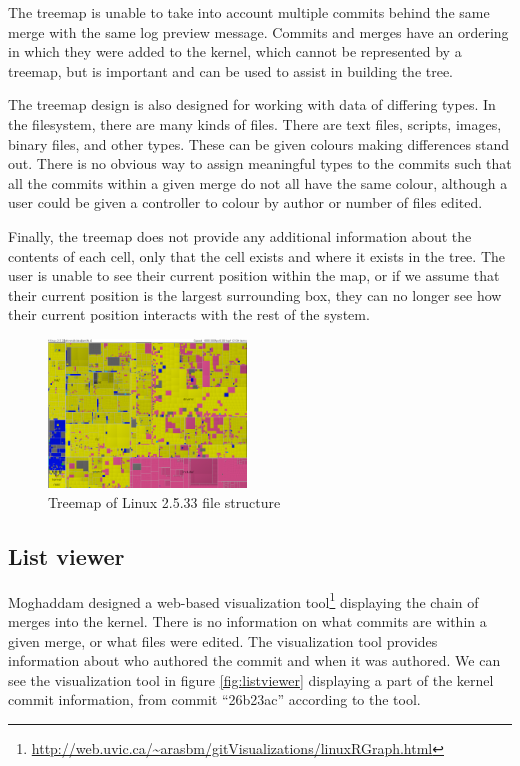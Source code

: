 \documentclass[conference, draftclsnofoot]{IEEEtran}
\begin{document}
The treemap is unable to take into account multiple commits behind the same merge
with the same log preview message. Commits and merges have an ordering in which they
were added to the kernel, which cannot be represented by a treemap, but is important
and can be used to assist in building the tree.

The treemap design is also designed for working with data of differing types. In the
filesystem, there are many kinds of files. There are text files, scripts, images,
binary files, and other types. These can be given colours making differences stand
out. There is no obvious way to assign meaningful types to the commits such that all
the commits within a given merge do not all have the same colour, although a user
could be given a controller to colour by author or number of files edited.

Finally, the treemap does not provide any additional information about the
contents of each cell, only that the cell exists and where it exists in the
tree. The user is unable to see their current position within the map, or if we
assume that their current position is the largest surrounding box, they can
no longer see how their current position interacts with the rest of the
system.

\begin{figure}
        \centering
        \includegraphics[width=0.47\textwidth]{figures/kernel-files.png}
        \caption{Treemap of Linux 2.5.33 file structure}
        \label{fig:treemap}
\end{figure}

\subsection{List viewer}

Moghaddam designed a web-based visualization
tool\footnote{\url{http://web.uvic.ca/~arasbm/gitVisualizations/linuxRGraph.html}}
displaying the chain of merges into the kernel. There is no information on what
commits are within a given merge, or what files were edited. The visualization
tool provides information about who authored the commit and when it was
authored. We can see the visualization tool in figure \ref{fig:listviewer}
displaying a part of the kernel commit information, from commit ``26b23ac''
according to the tool.
\end{document}
